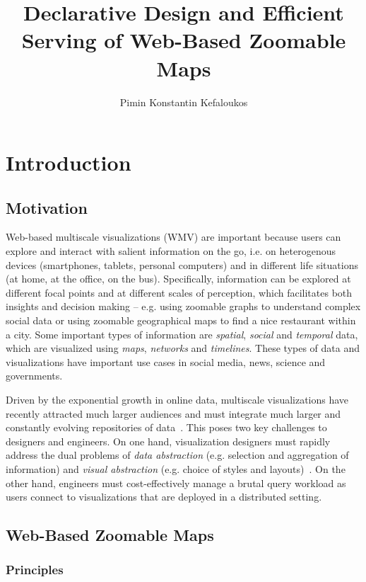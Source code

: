 \documentclass[11pt, oneside]{report}   	%
\title{Declarative Design and Efficient Serving of Web-Based Zoomable Maps}
\author{Pimin Konstantin Kefaloukos}
\begin{document}
\maketitle

\tableofcontents

\chapter{Introduction}

\section{Motivation}
Web-based multiscale visualizations (WMV) are important because users can explore and interact with salient information on the go, i.e. on heterogenous devices (smartphones, tablets, personal computers) and in different life situations (at home, at the office, on the bus).  Specifically, information can be explored at different focal points and at different scales of perception, which facilitates both insights and decision making -- e.g. using zoomable graphs to understand complex social data or using zoomable geographical maps to find a nice restaurant within a city. Some important types of information are \emph{spatial}, \emph{social} and \emph{temporal} data, which are visualized using \emph{maps}, \emph{networks} and \emph{timelines}. These types of data and visualizations have important use cases in social media, news, science and governments.

Driven by the exponential growth in online data, multiscale visualizations have recently attracted much larger audiences and must integrate much larger and constantly evolving repositories of data~\cite{gst, foo}. This poses two key challenges to designers and engineers. On one hand, visualization designers must rapidly address the dual problems of \emph{data abstraction} (e.g. selection and aggregation of information) and \emph{visual abstraction} (e.g. choice of styles and layouts)~\cite{stolte2003multiscale}. On the other hand, engineers must cost-effectively manage a brutal query workload as users connect to visualizations that are deployed in a distributed setting.

\section{Web-Based Zoomable Maps}

\subsection{Principles}
\end{document}
